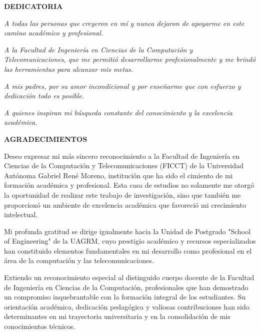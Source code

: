 \documentclass[spanish,12pt,letterpaper]{report}
\begin{document}
\newpage
\thispagestyle{empty}
\vspace*{5cm}
\begin{center}
\textbf{\Large DEDICATORIA}
\end{center}
\vspace{2cm}

\begin{flushright}
\textit{A todas las personas que creyeron en mí y nunca dejaron de apoyarme en este camino académico y profesional.}

\vspace{1cm}

\textit{A la Facultad de Ingeniería en Ciencias de la Computación y Telecomunicaciones, que me permitió desarrollarme profesionalmente y me brindó las herramientas para alcanzar mis metas.}

\vspace{1cm}

\textit{A mis padres, por su amor incondicional y por enseñarme que con esfuerzo y dedicación todo es posible.}

\vspace{1cm}

\textit{A quienes inspiran mi búsqueda constante del conocimiento y la excelencia académica.}
\end{flushright}

\newpage
\thispagestyle{empty}
\begin{center}
\textbf{\Large AGRADECIMIENTOS}
\end{center}
\doublespacing

Deseo expresar mi más sincero reconocimiento a la Facultad de Ingeniería en Ciencias de la Computación y Telecomunicaciones (FICCT) de la Universidad Autónoma Gabriel René Moreno, institución que ha sido el cimiento de mi formación académica y profesional. Esta casa de estudios no solamente me otorgó la oportunidad de realizar este trabajo de investigación, sino que también me proporcionó un ambiente de excelencia académica que favoreció mi crecimiento intelectual.

Mi profunda gratitud se dirige igualmente hacia la Unidad de Postgrado "School of Engineering" de la UAGRM, cuyo prestigio académico y recursos especializados han constituido elementos fundamentales en mi desarrollo como profesional en el área de la computación y las telecomunicaciones.

Extiendo un reconocimiento especial al distinguido cuerpo docente de la Facultad de Ingeniería en Ciencias de la Computación, profesionales que han demostrado un compromiso inquebrantable con la formación integral de los estudiantes. Su orientación académica, dedicación pedagógica y valiosas contribuciones han sido determinantes en mi trayectoria universitaria y en la consolidación de mis conocimientos técnicos.
\end{document}
